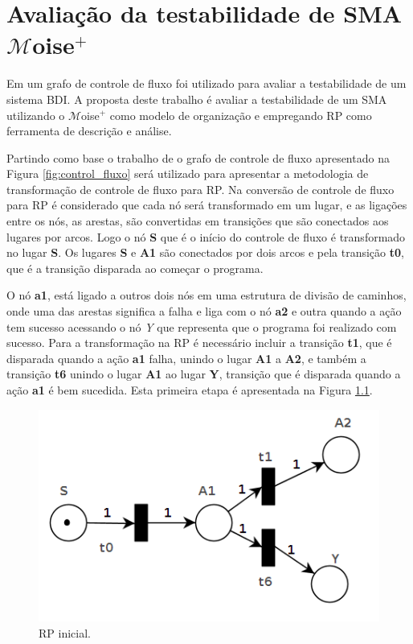\chapter{Avaliação da testabilidade de SMA $\mathcal{M}$oise$^{+}$ }

Em \cite{winikoff2014testability} um grafo de controle de fluxo foi utilizado para avaliar a testabilidade de um sistema BDI. A proposta deste trabalho é avaliar a testabilidade de um SMA utilizando o $\mathcal{M}$oise$^{+}$ como modelo de organização e empregando RP como ferramenta de descrição e análise.

Partindo como base o trabalho de \cite{winikoff2017bdi} o grafo de controle de fluxo apresentado na Figura \ref{fig:control_fluxo} será utilizado para apresentar a metodologia de transformação de controle de fluxo para RP. Na conversão de controle de fluxo para RP é considerado que cada nó será transformado em um lugar, e as ligações entre os nós, as arestas, são convertidas em transições que são conectados aos lugares por arcos. Logo o nó \textbf{S} que é o início do controle de fluxo é transformado no lugar \textbf{S}. Os lugares \textbf{S} e \textbf{A1} são conectados por dois arcos e pela transição \textbf{t0}, que é a transição disparada ao começar o programa.

O nó \textbf{a1}, está ligado a outros dois nós em uma estrutura de divisão de caminhos, onde uma das arestas significa a falha e liga com o nó \textbf{a2} e outra quando a ação tem sucesso acessando o nó \textit{Y} que representa que o programa foi realizado com sucesso. Para a transformação na RP é necessário incluir a transição \textbf{t1}, que é disparada quando a ação \textbf{a1} falha, unindo o lugar \textbf{A1} a \textbf{A2}, e também a transição \textbf{t6} unindo o lugar \textbf{A1} ao lugar \textbf{Y}, transição que é disparada quando a ação \textbf{a1}  é bem sucedida. Esta primeira etapa é apresentada na Figura \ref{fig:4-fluxo-rp0.png}.

\begin{figure}[ht]
    \centering
    \includegraphics[scale=0.4]{imagens/4-fluxo-rp0.png}
    \caption{RP inicial.}
    \label{fig:4-fluxo-rp0.png}
\end{figure}

